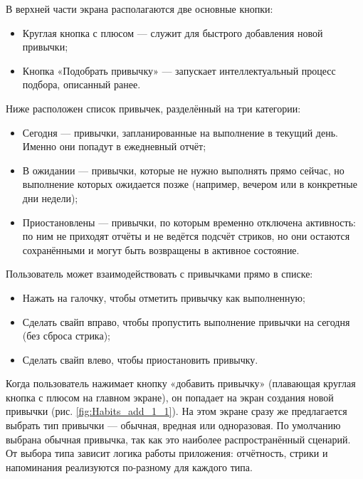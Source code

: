 \documentclass[pdflatex,sn-mathphys-num]{sn-jnl}%
\theoremstyle{thmstyleone}%
\theoremstyle{thmstyletwo}%
\theoremstyle{thmstylethree}%
\begin{document}
В верхней части экрана располагаются две основные кнопки:

\begin{itemize}
    \item Круглая кнопка с плюсом — служит для быстрого добавления новой привычки;
    \item Кнопка «Подобрать привычку» — запускает интеллектуальный процесс подбора, описанный ранее.
\end{itemize}

Ниже расположен список привычек, разделённый на три категории:

\begin{itemize}
    \item Сегодня — привычки, запланированные на выполнение в текущий день. Именно они попадут в ежедневный отчёт;
    \item В ожидании — привычки, которые не нужно выполнять прямо сейчас, но выполнение которых ожидается позже (например, вечером или в конкретные дни недели);
    \item Приостановлены — привычки, по которым временно отключена активность: по ним не приходят отчёты и не ведётся подсчёт стриков, но они остаются сохранёнными и могут быть возвращены в активное состояние.
\end{itemize}

Пользователь может взаимодействовать с привычками прямо в списке:

\begin{itemize}
    \item Нажать на галочку, чтобы отметить привычку как выполненную;
    \item Сделать свайп вправо, чтобы пропустить выполнение привычки на сегодня (без сброса стрика);
    \item Сделать свайп влево, чтобы приостановить привычку.
\end{itemize}

Когда пользователь нажимает кнопку «добавить привычку» (плавающая круглая кнопка с плюсом на главном экране), он попадает на экран создания новой привычки (рис. \ref{fig:Habits_add_1_1}). На этом экране сразу же предлагается выбрать тип привычки — обычная, вредная или одноразовая. По умолчанию выбрана обычная привычка, так как это наиболее распространённый сценарий. От выбора типа зависит логика работы приложения: отчётность, стрики и напоминания реализуются по-разному для каждого типа.
\end{document}
